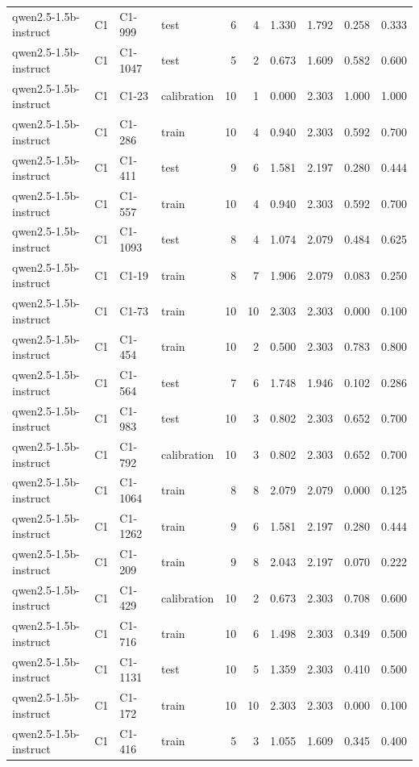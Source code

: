 \begin{table}
\begin{tabular}{llllrrrrrr}
qwen2.5-1.5b-instruct & C1 & C1-999 & test & 6 & 4 & 1.330 & 1.792 & 0.258 & 0.333 \\
qwen2.5-1.5b-instruct & C1 & C1-1047 & test & 5 & 2 & 0.673 & 1.609 & 0.582 & 0.600 \\
qwen2.5-1.5b-instruct & C1 & C1-23 & calibration & 10 & 1 & 0.000 & 2.303 & 1.000 & 1.000 \\
qwen2.5-1.5b-instruct & C1 & C1-286 & train & 10 & 4 & 0.940 & 2.303 & 0.592 & 0.700 \\
qwen2.5-1.5b-instruct & C1 & C1-411 & test & 9 & 6 & 1.581 & 2.197 & 0.280 & 0.444 \\
qwen2.5-1.5b-instruct & C1 & C1-557 & train & 10 & 4 & 0.940 & 2.303 & 0.592 & 0.700 \\
qwen2.5-1.5b-instruct & C1 & C1-1093 & test & 8 & 4 & 1.074 & 2.079 & 0.484 & 0.625 \\
qwen2.5-1.5b-instruct & C1 & C1-19 & train & 8 & 7 & 1.906 & 2.079 & 0.083 & 0.250 \\
qwen2.5-1.5b-instruct & C1 & C1-73 & train & 10 & 10 & 2.303 & 2.303 & 0.000 & 0.100 \\
qwen2.5-1.5b-instruct & C1 & C1-454 & train & 10 & 2 & 0.500 & 2.303 & 0.783 & 0.800 \\
qwen2.5-1.5b-instruct & C1 & C1-564 & test & 7 & 6 & 1.748 & 1.946 & 0.102 & 0.286 \\
qwen2.5-1.5b-instruct & C1 & C1-983 & test & 10 & 3 & 0.802 & 2.303 & 0.652 & 0.700 \\
qwen2.5-1.5b-instruct & C1 & C1-792 & calibration & 10 & 3 & 0.802 & 2.303 & 0.652 & 0.700 \\
qwen2.5-1.5b-instruct & C1 & C1-1064 & train & 8 & 8 & 2.079 & 2.079 & 0.000 & 0.125 \\
qwen2.5-1.5b-instruct & C1 & C1-1262 & train & 9 & 6 & 1.581 & 2.197 & 0.280 & 0.444 \\
qwen2.5-1.5b-instruct & C1 & C1-209 & train & 9 & 8 & 2.043 & 2.197 & 0.070 & 0.222 \\
qwen2.5-1.5b-instruct & C1 & C1-429 & calibration & 10 & 2 & 0.673 & 2.303 & 0.708 & 0.600 \\
qwen2.5-1.5b-instruct & C1 & C1-716 & train & 10 & 6 & 1.498 & 2.303 & 0.349 & 0.500 \\
qwen2.5-1.5b-instruct & C1 & C1-1131 & test & 10 & 5 & 1.359 & 2.303 & 0.410 & 0.500 \\
qwen2.5-1.5b-instruct & C1 & C1-172 & train & 10 & 10 & 2.303 & 2.303 & 0.000 & 0.100 \\
qwen2.5-1.5b-instruct & C1 & C1-416 & train & 5 & 3 & 1.055 & 1.609 & 0.345 & 0.400 \\

\end{tabular}
\end{table}
